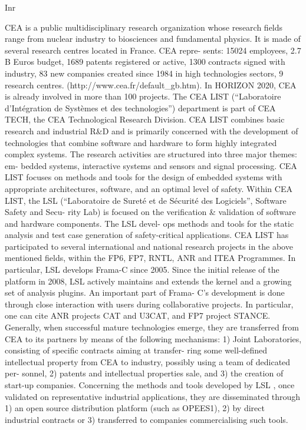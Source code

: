 \begin{sitedescription}{Inr}


CEA is a public multidisciplinary research organization whose research fields
range from nuclear industry to biosciences and fundamental physics. It is made
of several research centres located in France. CEA repre- sents: 15024
employees, 2.7 B Euros budget, 1689 patents registered or active, 1300 contracts
signed with industry, 83 new companies created since 1984 in high technologies
sectors, 9 research centres. (http://www.cea.fr/default_gb.htm). In HORIZON
2020, CEA is already involved in more than 100 projects. The CEA LIST
(“Laboratoire d'Intégration de Systèmes et des technologies”) department is part
of CEA TECH, the CEA Technological Research Division. CEA LIST combines basic
research and industrial R&D and is primarily concerned with the development of
technologies that combine software and hardware to form highly integrated
complex systems. The research activities are structured into three major themes:
em- bedded systems, interactive systems and sensors and signal processing. CEA
LIST focuses on methods and tools for the design of embedded systems with
appropriate architectures, software, and an optimal level of safety. Within CEA
LIST, the LSL (“Laboratoire de Sureté et de Sécurité des Logiciels”, Software
Safety and Secu- rity Lab) is focused on the verification & validation of
software and hardware components. The LSL devel- ops methods and tools for the
static analysis and test case generation of safety-critical applications. CEA
LIST has participated to several international and national research projects in
the above mentioned fields, within the FP6, FP7, RNTL, ANR and ITEA Programmes.
In particular, LSL develops Frama-C since 2005. Since the initial release of the
platform in 2008, LSL actively maintains and extends the kernel and a growing
set of analysis plugins. An important part of Frama- C's development is done
through close interaction with users during collaborative projects. In
particular, one can cite ANR projects CAT and U3CAT, and FP7 project STANCE.
Generally, when successful mature technologies emerge, they are transferred from
CEA to its partners by means of the following mechanisms: 1) Joint Laboratories,
consisting of specific contracts aiming at transfer- ring some well-defined
intellectual property from CEA to industry, possibly using a team of dedicated
per- sonnel, 2) patents and intellectual properties sale, and 3) the creation of
start-up companies. Concerning the methods and tools developed by LSL , once
validated on representative industrial applications, they are disseminated
through 1) an open source distribution platform (such as OPEES1), 2) by direct
industrial contracts or 3) transferred to companies commercialising such tools.


\end{sitedescription}
